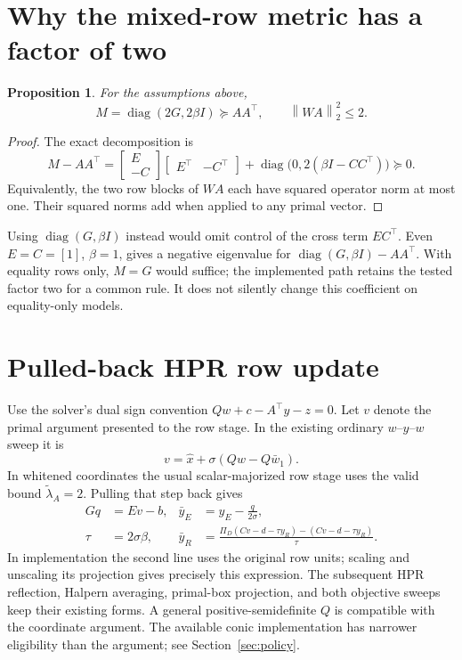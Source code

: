 \documentclass[11pt]{article}
\newtheorem{proposition}{Proposition}
\newcommand{\norm}[1]{\left\lVert#1\right\rVert}
\begin{document}
\section{Why the mixed-row metric has a factor of two}
\begin{proposition}\label{prop:maj}
For the assumptions above,
\[
 M=\operatorname{diag}(2G,2\beta I)\succeq AA^\top,
 \qquad \norm{WA}_2^2\le2.
\]
\end{proposition}
\begin{proof}
The exact decomposition is
\[
 M-AA^\top=
 \begin{bmatrix}E\\-C\end{bmatrix}
 \begin{bmatrix}E^\top&-C^\top\end{bmatrix}
 +\operatorname{diag}\bigl(0,2(\beta I-CC^\top)\bigr)\succeq0.
\]
Equivalently, the two row blocks of $WA$ each have squared operator norm at
most one. Their squared norms add when applied to any primal vector.
\end{proof}
Using $\operatorname{diag}(G,\beta I)$ instead would omit control of the cross
term $EC^\top$. Even $E=C=[1]$, $\beta=1$, gives a negative eigenvalue for
$\operatorname{diag}(G,\beta I)-AA^\top$. With equality rows only, $M=G$
would suffice; the implemented path retains the tested factor two for a common
rule. It does not silently change this coefficient on equality-only models.

\section{Pulled-back HPR row update}
Use the solver's dual sign convention $Qw+c-A^\top y-z=0$.
Let $v$ denote the primal argument presented to the row stage. In the existing
ordinary $w$--$y$--$w$ sweep it is
\[
 v=\widehat x+\sigma(Qw-Q\bar w_1).
\]
In whitened coordinates the usual scalar-majorized row stage uses the valid
bound $\widetilde\lambda_A=2$. Pulling that step back gives
\begin{align}
 Gq&=Ev-b, & \bar y_E&=y_E-\frac{q}{2\sigma},\label{eq:ystep}\\
 \tau&=2\sigma\beta, &
 \bar y_R&=\frac{\Pi_D(Cv-d-\tau y_R)-(Cv-d-\tau y_R)}{\tau}.
\end{align}
In implementation the second line uses the original row units; scaling and
unscaling its projection gives precisely this expression. The subsequent HPR
reflection, Halpern averaging, primal-box projection, and both objective sweeps
keep their existing forms. A general positive-semidefinite $Q$ is compatible
with the coordinate argument. The available conic implementation has narrower
eligibility than the argument; see Section~\ref{sec:policy}.
\end{document}
